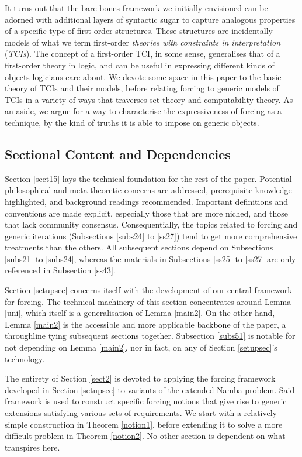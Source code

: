 \documentclass[12pt]{article}
\numberwithin{equation}{section}
\begin{document}
It turns out that the bare-bones framework we initially envisioned can be adorned with additional layers of syntactic sugar to capture analogous properties of a specific type of first-order structures. These structures are incidentally models of what we term first-order \emph{theories with constraints in interpretation} (\emph{TCIs}). The concept of a first-order TCI, in some sense, generalises that of a first-order theory in logic, and can be useful in expressing different kinds of objects logicians care about. We devote some space in this paper to the basic theory of TCIs and their models, before relating forcing to generic models of TCIs in a variety of ways that traverses set theory and computability theory. As an aside, we argue for a way to characterise the expressiveness of forcing as a technique, by the kind of truths it is able to impose on generic objects.

\subsection{Sectional Content and Dependencies}

Section \ref{sect15} lays the technical foundation for the rest of the paper. Potential philosophical and meta-theoretic concerns are addressed, prerequisite knowledge highlighted, and background readings recommended. Important definitions and conventions are made explicit, especially those that are more niched, and those that lack community consensus. Consequentially, the topics related to forcing and generic iterations (Subsections \ref{subs24} to \ref{ss27}) tend to get more comprehensive treatments than the others. All subsequent sections depend on Subsections \ref{subs21} to \ref{subs24}, whereas the materials in Subsections \ref{ss25} to \ref{ss27} are only referenced in Subsection \ref{ss43}.

Section \ref{setupsec} concerns itself with the development of our central framework for forcing. The technical machinery of this section concentrates around Lemma \ref{uni}, which itself is a generalisation of Lemma \ref{main2}. On the other hand, Lemma \ref{main2} is the accessible and more applicable backbone of the paper, a throughline tying subsequent sections together. Subsection \ref{subs51} is notable for not depending on Lemma \ref{main2}, nor in fact, on any of Section \ref{setupsec}'s technology.

The entirety of Section \ref{sect2} is devoted to applying the forcing framework developed in Section \ref{setupsec} to variants of the extended Namba problem. Said framework is used to construct specific forcing notions that give rise to generic extensions satisfying various sets of requirements. We start with a relatively simple construction in Theorem \ref{notion1}, before extending it to solve a more difficult problem in Theorem \ref{notion2}. No other section is dependent on what transpires here.
\end{document}
